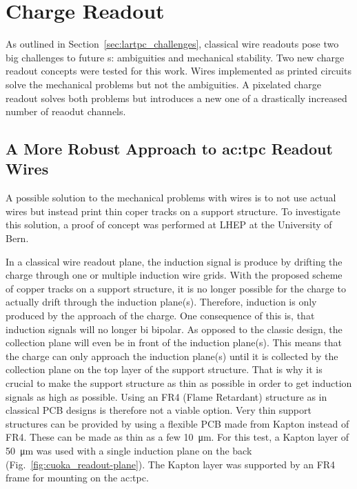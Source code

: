 \section{Charge Readout}
\label{sec:studies_charge-ro}

As outlined in Section~\ref{sec:lartpc_challenges}, classical wire readouts pose two big challenges to future \lartpc{}s: ambiguities and mechanical stability.
Two new charge readout concepts were tested for this work.
Wires implemented as printed circuits solve the mechanical problems but not the ambiguities.
A pixelated charge readout solves both problems but introduces a new one of a drastically increased number of reaodut channels.


\subsection{A More Robust Approach to \gls{ac:tpc} Readout Wires}
\label{sec:studies_charge-ro_cuoka}

A possible solution to the mechanical problems with wires is to not use actual wires but instead print thin coper tracks on a support structure.
To investigate this solution, a proof of concept was performed at LHEP at the University of Bern.

In a classical wire readout plane, the induction signal is produce by drifting the charge through one or multiple induction wire grids.
With the proposed scheme of copper tracks on a support structure, it is no longer possible for the charge to actually drift through the induction plane(s).
Therefore, induction is only produced by the approach of the charge.
One consequence of this is, that induction signals will no longer bi bipolar.
As opposed to the classic design, the collection plane will even be in front of the induction plane(s).
This means that the charge can only approach the induction plane(s) until it is collected by the collection plane on the top layer of the support structure.
That is why it is crucial to make the support structure as thin as possible in order to get induction signals as high as possible.
Using an FR4 (Flame Retardant) structure as in classical PCB designs is therefore not a viable option.
Very thin support structures can be provided by using a flexible PCB made from Kapton instead of FR4.
These can be made as thin as a few \SI{10}{\micro\metre}.
For this test, a Kapton layer of \SI{50}{\micro\metre} was used with a single induction plane on the back (Fig.~\ref{fig:cuoka_readout-plane}).
The Kapton layer was supported by an FR4 frame for mounting on the \gls{ac:tpc}.

